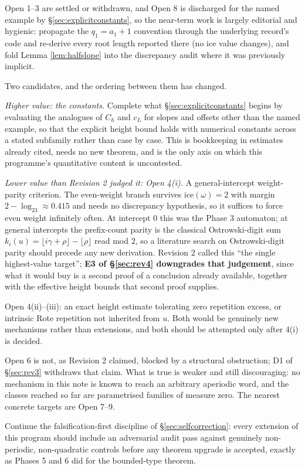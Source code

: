 \documentclass[11pt]{article}
\begin{document}
\begin{description}[leftmargin=3em,style=nextline]
\item[Near term.] Open 1--3 are settled or withdrawn, and Open 8 is discharged for the named example
by \S\ref{sec:explicitconstants}, so the near-term work is largely editorial and hygienic: propagate the $q_1=a_1+1$ convention through the underlying record's code
and re-derive every root length reported there (no $\text{ice}$ value changes), and fold Lemma
\ref{lem:halfslope} into the discrepancy audit where it was previously implicit.
\item[Medium term.] Two candidates, and the ordering between them has changed.

\emph{Higher value: the constants.} Complete what \S\ref{sec:explicitconstants} begins by evaluating
the analogues of $C_h$ and $c_L$ for slopes and offsets other than the named example, so that the
explicit height bound holds with numerical constants across a stated subfamily rather than case by
case. This is bookkeeping in estimates already cited, needs no new theorem, and is the only axis on
which this programme's quantitative content is uncontested.

\emph{Lower value than Revision 2 judged it: Open 4(i).} A general-intercept weight-parity criterion.
The even-weight branch survives $\text{ice}(\omega)=2$ with margin $2-\log_23\approx0.415$ and needs
no discrepancy hypothesis, so it suffices to force even weight infinitely often. At intercept $0$
this was the Phase 3 automaton; at general intercepts the prefix-count parity is the classical
Ostrowski-digit sum $k_i(u)=\lfloor i\gamma+\rho\rfloor-\lfloor\rho\rfloor$ read mod $2$, so a
literature search on Ostrowski-digit parity should precede any new derivation. Revision 2 called this
``the single highest-value target''; \textbf{E3 of \S\ref{sec:rev4} downgrades that judgement}, since
what it would buy is a second proof of a conclusion already available, together with the effective
height bounds that second proof supplies.
\item[Longer term.] Open 4(ii)--(iii): an exact height estimate tolerating zero repetition excess,
or intrinsic Rote repetition not inherited from $u$. Both would be genuinely new mechanisms rather
than extensions, and both should be attempted only after 4(i) is decided.
\item[Structural.] Open 6 is not, as Revision 2 claimed, blocked by a structural obstruction; D1 of
\S\ref{sec:rev3} withdraws that claim. What is true is weaker and still discouraging: no mechanism in
this note is known to reach an arbitrary aperiodic word, and the classes reached so far are
parametrised families of measure zero. The nearest concrete targets are Open 7--9.
\item[Process.] Continue the falsification-first discipline of \S\ref{sec:selfcorrection}: every extension of this program should include an adversarial audit pass against genuinely non-periodic, non-quadratic controls before any theorem upgrade is accepted, exactly as Phases 5 and 6 did for the bounded-type theorem.
\end{description}
\end{document}
